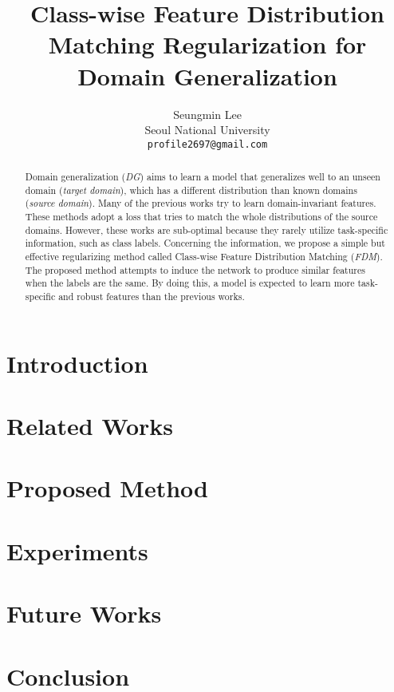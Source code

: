 \documentclass[10pt,twocolumn,letterpaper]{article}
\begin{document}
\title{Class-wise Feature Distribution Matching Regularization for Domain Generalization}

\author{Seungmin Lee\\
Seoul National University\\
{\tt\small profile2697@gmail.com}
}

\maketitle

\begin{abstract}
 Domain generalization (\textit{DG}) aims to learn a model that generalizes well to an unseen domain (\textit{target domain}), which has a different distribution than known domains (\textit{source domain}). Many of the previous works try to learn domain-invariant features. These methods adopt a loss that tries to match the whole distributions of the source domains. However, these works are sub-optimal because they rarely utilize task-specific information, such as class labels. Concerning the information, we propose a simple but effective regularizing method called Class-wise Feature Distribution Matching (\textit{FDM}). The proposed method attempts to induce the network to produce similar features when the labels are the same. By doing this, a model is expected to learn more task-specific and robust features than the previous works.
\end{abstract}

\section{Introduction}


\section{Related Works}


\section{Proposed Method}


\section{Experiments}


\section{Future Works}


\section{Conclusion}



{\small


}
\end{document}
